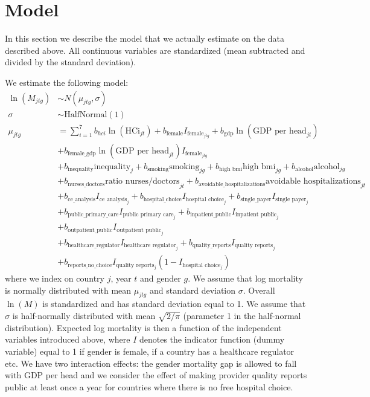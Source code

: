 \documentclass[a4paper,12pt]{article}
\begin{document}
\section{Model}
\label{sec:org5eec8de}

In this section we describe the model that we actually estimate on the data described above.  All continuous variables are standardized (mean subtracted and divided by the standard deviation).

We estimate the following model:
\begin{align*}
\ln(M_{jtg}) &\sim N(\mu_{jtg},\sigma) \\
\sigma & \sim\text{HalfNormal}(1) \\
\mu_{jtg} &= \sum_{i=1}^7 b_{hci} \ln(\text{HCi}_{jt}) + b_{\text{female}} I_{\text{female}_{jtg}} + b_{\text{gdp}} \ln(\text{GDP per head}_{jt}) \\
 & + b_{\text{female\_gdp}} \ln(\text{GDP per head}_{jt})  I_{\text{female}_{jtg}} \\
 & + b_{\text{inequality}} \text{inequality}_{j} + b_{\text{smoking}} \text{smoking}_{jg}+ b_{\text{high bmi}} \text{high bmi}_{jg}+ b_{\text{alcohol}} \text{alcohol}_{jg} \\
 & + b_{\text{nurses\_doctors}} \text{ratio nurses/doctors}_{jt} + b_{\text{avoidable\_hospitalizations}} \text{avoidable hospitalizations}_{jt} \\
 & + b_{\text{ce\_analysis}} I_{\text{ce analysis}_{j}} +  b_{\text{hospital\_choice}} I_{\text{hospital choice}_{j}} + b_{\text{single\_payer}} I_{\text{single payer}_{j}} \\
 & +  b_{\text{public\_primary\_care}} I_{\text{public primary care}_j} + b_{\text{inpatient\_public}} I_{\text{inpatient public}_{j}} \\
 & + b_{\text{outpatient\_public}} I_{\text{outpatient public}_j} \\
 & + b_{\text{healthcare\_regulator}} I_{\text{healthcare regulator}_j} + b_{\text{quality\_reports}} I_{\text{quality reports}_j} \\
 & + b_{\text{reports\_no\_choice}} I_{\text{quality reports}_j} (1-I_{\text{hospital choice}_j})
\end{align*}
where we index on country \(j\), year \(t\) and gender \(g\). We assume that log mortality is normally distributed with mean \(\mu_{jtg}\) and standard deviation \(\sigma\). Overall \(\ln(M)\) is standardized and has standard deviation equal to 1. We assume that \(\sigma\) is half-normally distributed with mean \(\sqrt{2/\pi}\) (parameter 1 in the half-normal distribution). Expected log mortality is then a function of the independent variables introduced above, where \(I\) denotes the indicator function (dummy variable) equal to 1 if gender is female, if a country has a healthcare regulator etc. We have two interaction effects: the gender mortality gap is allowed to fall with GDP per head and we consider the effect of making provider quality reports public at least once a year for countries where there is no free hospital choice.
\end{document}
